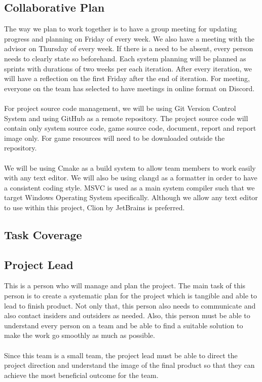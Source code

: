 \subsection{Collaborative Plan}
\label{subsec:collaborative-plan}
The way we plan to work together is to have a group meeting for updating progress and planning on Friday of every week.
We also have a meeting with the advisor on Thursday of every week.
If there is a need to be absent, every person needs to clearly state so beforehand.
Each system planning will be planned as sprints with durations of two weeks per each iteration.
After every iteration, we will have a reflection on the first Friday after the end of iteration.
For meeting, everyone on the team has selected to have meetings in online format on Discord.
\\\\
For project source code management, we will be using Git Version Control System and using GitHub as
a remote repository.
The project source code will contain only system source code, game source code, document, report and report image only.
For game resources will need to be downloaded outside the repository.
\\\\
We will be using Cmake as a build system to allow team members to work easily with any text editor.
We will also be using clangd as a formatter in order to have a consistent coding style.
MSVC is used as a main system compiler such that we target Windows Operating System specifically.
Although we allow any text editor to use within this project, Clion by JetBrains is preferred.

\subsection{Task Coverage}
\label{subsec:task-coverage}

\subsection*{Project Lead}
This is a person who will manage and plan the project.
The main task of this person is to create a systematic plan for the project which is tangible and able to lead to finish product.
Not only that, this person also needs to communicate and also contact insiders and outsiders as needed.
Also, this person must be able to understand every person on a team and be able to find a suitable solution to make
the work go smoothly as much as possible.
\\\\
Since this team is a small team, the project lead must be able to direct the project direction and understand the image
of the final product so that they can achieve the most beneficial outcome for the team.

